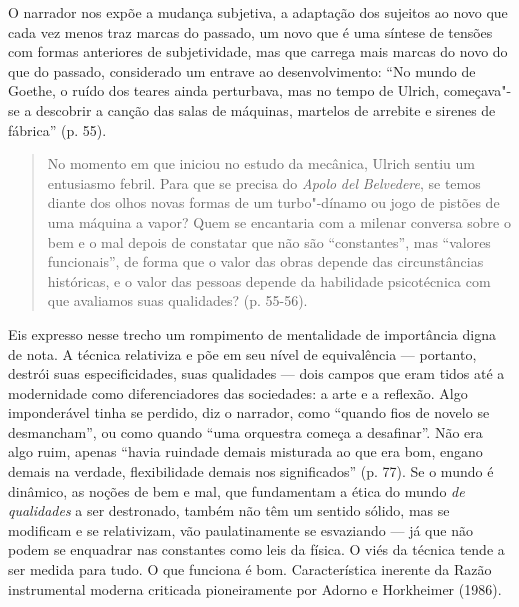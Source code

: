 O narrador nos expõe a mudança subjetiva, a adaptação dos sujeitos ao
novo que cada vez menos traz marcas do passado, um novo que é uma
síntese de tensões com formas anteriores de subjetividade, mas que
carrega mais marcas do novo do que do passado, considerado um entrave ao
desenvolvimento: ``No mundo de Goethe, o ruído dos teares ainda
perturbava, mas no tempo de Ulrich, começava"-se a descobrir a canção das
salas de máquinas, martelos de arrebite e sirenes de fábrica'' (p. 55).

\begin{quote}
No momento em que iniciou no estudo da mecânica, Ulrich sentiu um
entusiasmo febril. Para que se precisa do \emph{Apolo} \emph{del}
\emph{Belvedere}, se temos diante dos olhos novas formas de um
turbo"-dínamo ou jogo de pistões de uma máquina a vapor? Quem se
encantaria com a milenar conversa sobre o bem e o mal depois de
constatar que não são ``constantes'', mas ``valores funcionais'', de
forma que o valor das obras depende das circunstâncias históricas, e o
valor das pessoas depende da habilidade psicotécnica com que avaliamos
suas qualidades? (p. 55-56).
\end{quote}

Eis expresso nesse trecho um rompimento de mentalidade de importância
digna de nota. A técnica relativiza e põe em seu nível de equivalência
--- portanto, destrói suas especificidades, suas qualidades --- dois
campos que eram tidos até a modernidade como diferenciadores das
sociedades: a arte e a reflexão. Algo imponderável tinha se perdido, diz
o narrador, como ``quando fios de novelo se desmancham'', ou como quando
``uma orquestra começa a desafinar''. Não era algo ruim, apenas ``havia
ruindade demais misturada ao que era bom, engano demais na verdade,
flexibilidade demais nos significados'' (p. 77). Se o mundo é dinâmico,
as noções de bem e mal, que fundamentam a ética do mundo \emph{de
qualidades} a ser destronado, também não têm um sentido sólido, mas se
modificam e se relativizam, vão paulatinamente se esvaziando --- já que
não podem se enquadrar nas constantes como leis da física. O viés da
técnica tende a ser medida para tudo. O que funciona é bom.
Característica inerente da Razão instrumental moderna criticada
pioneiramente por Adorno e Horkheimer (1986).

